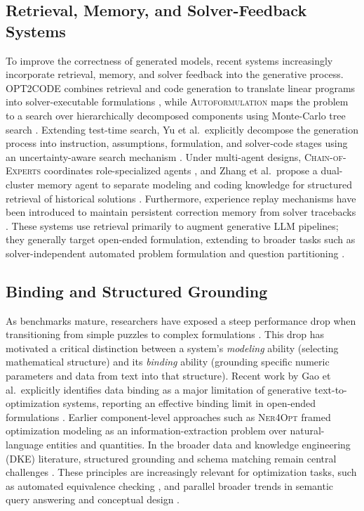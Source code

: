 \documentclass[pdflatex,sn-basic,Numbered]{sn-jnl}
\begin{document}
\subsection{Retrieval, Memory, and Solver-Feedback Systems}
\label{subsec:rw_retrieval_memory}

To improve the correctness of generated models, recent systems increasingly incorporate retrieval, memory, and solver feedback into the generative process. \textsc{OPT2CODE} combines retrieval and code generation to translate linear programs into solver-executable formulations \cite{ahmed2025opt2code}, while \textsc{Autoformulation} maps the problem to a search over hierarchically decomposed components using Monte-Carlo tree search \cite{astorga2025autoformulation}. Extending test-time search, Yu et al.\ explicitly decompose the generation process into instruction, assumptions, formulation, and solver-code stages using an uncertainty-aware search mechanism \cite{yu2026uncertainty}. Under multi-agent designs, \textsc{Chain-of-Experts} coordinates role-specialized agents \cite{xiao2024chainofexperts}, and Zhang et al.\ propose a dual-cluster memory agent to separate modeling and coding knowledge for structured retrieval of historical solutions \cite{zhang2026dual}. Furthermore, experience replay mechanisms have been introduced to maintain persistent correction memory from solver tracebacks \cite{xie2026escaping}. These systems use retrieval primarily to augment generative LLM pipelines; they generally target open-ended formulation, extending to broader tasks such as solver-independent automated problem formulation \cite{li2026solver} and question partitioning \cite{pan2025pamop}.

\subsection{Binding and Structured Grounding}
\label{subsec:rw_binding}

As benchmarks mature, researchers have exposed a steep performance drop when transitioning from simple puzzles to complex formulations \cite{miplibnl2026}. This drop has motivated a critical distinction between a system's \emph{modeling} ability (selecting mathematical structure) and its \emph{binding} ability (grounding specific numeric parameters and data from text into that structure). Recent work by Gao et al.\ explicitly identifies data binding as a major limitation of generative text-to-optimization systems, reporting an effective binding limit in open-ended formulations \cite{gao2026models}. Earlier component-level approaches such as \textsc{Ner4Opt} \cite{kadioglu2024ner4opt} framed optimization modeling as an information-extraction problem over natural-language entities and quantities. In the broader data and knowledge engineering (DKE) literature, structured grounding and schema matching remain central challenges \cite{yu2018spider,affolter2019nli,sheetrit2024rematch}. These principles are increasingly relevant for optimization tasks, such as automated equivalence checking \cite{zhai2025equivamap}, and parallel broader trends in semantic query answering and conceptual design \cite{rizzi2025conceptual,atzeni2026semantic}.
\end{document}
